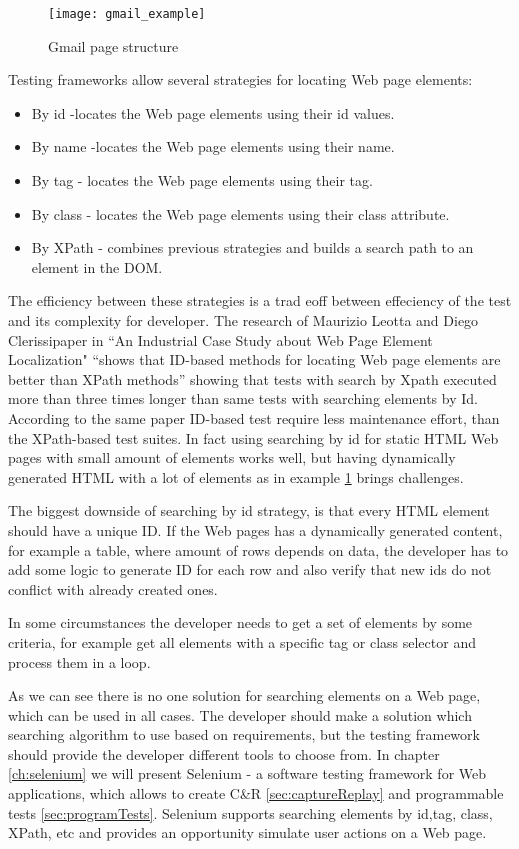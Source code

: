		\begin{figure}
		\centering
		  \texttt{[image: gmail\_example]}
		  \caption{Gmail page structure}
		  \label{fig:gmailexample}
		\end{figure}
		
		Testing frameworks allow several strategies for locating Web page elements:
		\begin{itemize}
		  \item By id -locates the Web page elements using their id values.
		  \item By name -locates the Web page elements using their name.
		  \item By tag - locates the Web page elements using their tag.
		  \item By class - locates the Web page elements using their class attribute.
		  \item By XPath - combines previous strategies and builds a search
		  path to an element in the DOM.
		\end{itemize}
		
		The efficiency between these strategies is a trad eoff between effeciency of
		the test and its complexity for developer. The research of Maurizio Leotta
		and Diego Clerissipaper in ``An Industrial Case Study about Web Page Element
		Localization" ``shows that ID-based methods for locating Web page elements are
		better than XPath methods''\cite{selenium4} showing that tests with search by
		Xpath executed more than three times longer than same tests with searching
		elements by Id. According to the same paper ID-based test require less
		maintenance effort, than the XPath-based test suites. In fact using searching by id for static HTML Web pages with small
		amount of elements works well, but having dynamically generated HTML with 
		a lot of elements as in example \ref{fig:gmailexample} brings challenges.
		
		The biggest downside of searching by id strategy, is that every HTML element
		should have a unique ID. If the Web pages has a dynamically generated content,
		for example a table, where amount of rows depends on data, the
		developer has to add some logic to generate ID for each row and also verify
		that new ids do not conflict with already created ones. 
		
		In some circumstances the developer needs to get a set of elements by some
		criteria, for example get all elements with a specific tag or class selector
		and process them in a loop. 
		
		As we can see there is no one solution for searching elements on a Web page,
		which can be used in all cases. The developer should make a solution which
		searching algorithm to use based on requirements, but the testing framework
		should provide the developer different tools to choose from. In chapter
		\ref{ch:selenium} we will present Selenium - a software testing framework
		for Web applications, which allows to create C\&R \ref{sec:captureReplay} and 
    programmable tests \ref{sec:programTests}. Selenium  supports searching
    elements by id,tag, class, XPath, etc and provides an opportunity simulate
    user actions on a Web page.
		

 